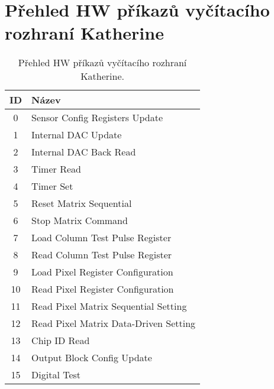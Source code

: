 \section{Přehled HW příkazů vyčítacího rozhraní Katherine}\label{chap:app:katherine:hw_commands}
\begin{table}[h]
	\begin{center}
		\begin{tabular}{|c|l|}
			\hline
            \textbf{ID} & \textbf{Název} \\
			\hline
            0 & Sensor Config Registers Update \\
            1 & Internal DAC Update \\
            2 & Internal DAC Back Read \\
            3 & Timer Read \\
            4 & Timer Set \\
            5 & Reset Matrix Sequential \\
            6 & Stop Matrix Command \\
            7 & Load Column Test Pulse Register \\
            8 & Read Column Test Pulse Register \\
            9 & Load Pixel Register Configuration \\
            10 & Read Pixel Register Configuration \\
            11 & Read Pixel Matrix Sequential Setting \\
            12 & Read Pixel Matrix Data-Driven Setting \\
            13 & Chip ID Read \\
            14 & Output Block Config Update \\
            15 & Digital Test \\
			\hline
		\end{tabular}
	\end{center}
	\caption{Přehled HW příkazů vyčítacího rozhraní Katherine.}
	\label{tab:app:hw_commands}
\end{table}

